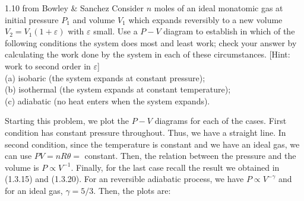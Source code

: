         \begin{eocproblem*}{1.10 from Bowley \& Sanchez}
            Consider $n$ moles of an ideal monatomic gas at initial pressure $P_1$ and volume $V_1$ which expands reversibly to a new volume $V_2 = V_1(1+\varepsilon)$ with $\varepsilon$ small. Use a $P-V$ diagram to establish in which of the following conditions the system does most and least work; check your answer by calculating the work done by the system in each of these circumstances. [Hint: work to second order in $\varepsilon$]\\
            (a) isobaric (the system expands at constant pressure);\\
            (b) isothermal (the system expands at constant temperature); \\
            (c) adiabatic (no heat enters when the system expands).
        \end{eocproblem*}
        \noindent Starting this problem, we plot the $P-V$ diagrams for each of the cases. First condition has constant pressure throughout. Thus, we have a straight line. In second condition, since the temperature is constant and we have an ideal gas, we can use $PV=nR\theta=$ constant. Then, the relation between the pressure and the volume is $P\propto V^{-1}$. Finally, for the last case recall the result we obtained in (1.3.15) and (1.3.20). For an reversible adiabatic process, we have $P\propto V^{-\gamma}$ and for an ideal gas, $\gamma = 5/3$. Then, the plots are: \\
